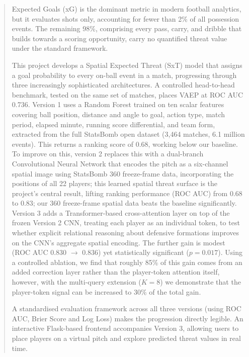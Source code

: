 \documentclass[a4paper,11pt,twoside]{report}
\begin{document}


\begin{abstract}
Expected Goals (xG) is the dominant metric in modern football analytics, but it evaluates shots only, accounting for fewer than 2\% of all possession events. The remaining 98\%, comprising every pass, carry, and dribble that builds towards a scoring opportunity, carry no quantified threat value under the standard framework.

This project develops a Spatial Expected Threat (SxT) model that assigns a goal probability to every on-ball event in a match, progressing through three increasingly sophisticated architectures. A controlled head-to-head benchmark, tested on the same set of matches, places VAEP at ROC AUC 0.736. Version 1 uses a Random Forest trained on ten scalar features covering ball position, distance and angle to goal, action type, match period, elapsed minute, running score differential, and team form, extracted from the full StatsBomb open dataset (3,464 matches, 6.1 million events). This returns a ranking score of 0.68, working below our baseline. To improve on this, version 2 replaces this with a dual-branch Convolutional Neural Network that encodes the pitch as a six-channel spatial image using StatsBomb 360 freeze-frame data, incorporating the positions of all 22 players; this learned spatial threat surface is the project's central result, lifting ranking performance (ROC AUC) from 0.68 to 0.83; our 360 freeze-frame spatial data beats the baseline significantly. Version 3 adds a Transformer-based cross-attention layer on top of the frozen Version 2 CNN, treating each player as an individual token, to test whether explicit relational reasoning about defensive formations improves on the CNN's aggregate spatial encoding. The further gain is modest (ROC AUC 0.830 $\to$ 0.836) yet statistically significant ($p = 0.017$). Using a controlled ablation, we find that roughly 85\% of this gain comes from an added correction layer rather than the player-token attention itself, however, with the multi-query extension ($K=8$) we demonstrate that the player-token signal can be increased to 30\% of the total gain.

A standardised evaluation framework across all three versions (using ROC AUC, Brier Score and Log Loss) makes the progression directly legible. An interactive Flask-based frontend accompanies Version 3, allowing users to place players on a virtual pitch and explore predicted threat values in real time.
\end{abstract}
\end{document}
